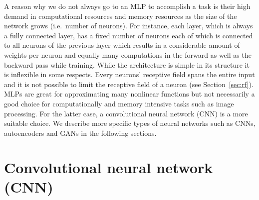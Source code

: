 \documentclass[a4paper,12pt]{report}
\begin{document}
A reason why we do not always go to an MLP to accomplish a task is their high demand in computational resources and memory resources as the size of the network grows (i.e.\ number of neurons). For instance, each layer, which is always a fully connected layer, has a fixed number of neurons each of which is connected to all neurons of the previous layer which results in a considerable amount of weights per neuron and equally many computations in the forward as well as the backward pass while training. While the architecture is simple in its structure it is inflexible in some respects. Every neurons' receptive field spans the entire input and it is not possible to limit the receptive field of a neuron (see Section~\ref{sec:rf}). MLPs are great for approximating many nonlinear functions but not necessarily a good choice for computationally and memory intensive tasks such as image processing. For the latter case, a convolutional neural network (CNN) is a more suitable choice. We describe more specific types of neural networks such as CNNs, autoencoders and GANs in the following sections.


\section{Convolutional neural network (CNN)}
\end{document}
